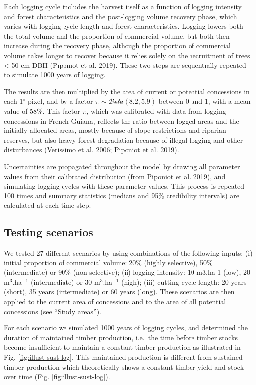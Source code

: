 \documentclass[
]{article}
\begin{document}
Each logging cycle includes the harvest itself as a function of logging intensity and forest characteristics and the post-logging volume recovery phase, which varies with logging cycle length and forest characteristics. Logging lowers both the total volume and the proportion of commercial volume, but both then increase during the recovery phase, although the proportion of commercial volume takes longer to recover because it relies solely on the recruitment of trees \textless{} 50 cm DBH (Piponiot et al. 2019). These two steps are sequentially repeated to simulate 1000 years of logging.

The results are then multiplied by the area of current or potential concessions in each 1\(^\circ\) pixel, and by a factor \(\pi \sim \mathcal{Beta}(8.2, 5.9)\) between 0 and 1, with a mean value of 58\%. This factor \(\pi\), which was calibrated with data from logging concessions in French Guiana, reflects the ratio between logged areas and the initially allocated areas, mostly because of slope restrictions and riparian reserves, but also heavy forest degradation because of illegal logging and other disturbances (Verissimo et al. 2006; Piponiot et al. 2019).

Uncertainties are propagated throughout the model by drawing all parameter values from their calibrated distribution (from Piponiot et al. 2019), and simulating logging cycles with these parameter values. This process is repeated 100 times and summary statistics (medians and 95\% credibility intervals) are calculated at each time step.

\hypertarget{testing-scenarios}{%
\subsection{Testing scenarios}\label{testing-scenarios}}

We tested 27 different scenarios by using combinations of the following inputs: (i) initial proportion of commercial volume: 20\% (highly selective), 50\% (intermediate) or 90\% (non-selective); (ii) logging intensity: 10 m3.ha-1 (low), 20 m\(^3\).ha\(^{-1}\) (intermediate) or 30 m\(^3\).ha\(^{-1}\) (high); (iii) cutting cycle length: 20 years (short), 35 years (intermediate) or 60 years (long). These scenarios are then applied to the current area of concessions and to the area of all potential concessions (see ``Study areas'').

For each scenario we simulated 1000 years of logging cycles, and determined the duration of maintained timber production, i.e.~the time before timber stocks become insufficient to maintain a constant timber production as illustrated in Fig. \ref{fig:illust-sust-log}. This maintained production is different from sustained timber production which theoretically shows a constant timber yield and stock over time (Fig. \ref{fig:illust-sust-log}).
\end{document}
